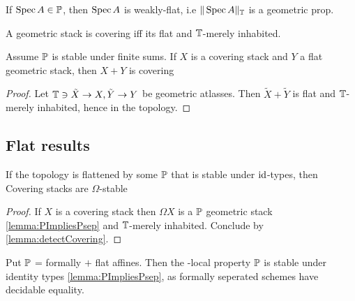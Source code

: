 \begin{lemma}
	If $\operatorname{Spec} A \in \mathbb{P}$, then $\operatorname{Spec} A$ is weakly-flat, i.e $\| \operatorname{Spec} A\|_{\mathbb{T}}$ is a geometric prop.
\end{lemma}
\begin{lemma}{\label{lemma:detectCovering}}
	A geometric stack is covering iff its flat and $\mathbb{T}$-merely inhabited.
\end{lemma}

\begin{lemma}
	Assume $\mathbb{P}$ is stable under finite sums. If $X$ is a covering stack and $Y$ a flat geometric stack, then $X + Y$ is covering
\end{lemma}
\begin{proof}
	Let $\mathbb{T} \ni \tilde X \to X, \tilde Y \to Y$ be geometric atlasses. Then $\tilde X+ \tilde Y$ is flat and $\mathbb{T}$-merely inhabited, hence in the topology.
\end{proof}
\subsection{Flat results}

\begin{lemma}
	If the topology is flattened by some $\mathbb{P}$ that is stable under $\operatorname{id}$-types, then Covering stacks are $\Omega$-stable
\end{lemma}
\begin{proof}
	If $X$ is a covering stack then $\Omega X$ is a $\mathbb{P}$ geometric stack \ref{lemma:PImpliesPsep} and $\mathbb{T}$-merely inhabited. Conclude by  \ref{lemma:detectCovering}.
\end{proof}
\begin{example}
	Put $\mathbb{P}$ = formally \etale $+$ flat affines. Then the \etale-local property $\mathbb{P}$ is stable under identity types \ref{lemma:PImpliesPsep}, as formally \etale seperated schemes have decidable equality. 
\end{example}
